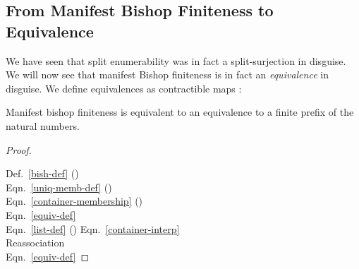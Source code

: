 \subsection{From Manifest Bishop Finiteness to Equivalence}
We have seen that split enumerability was in fact a split-surjection in
disguise.
We will now see that manifest Bishop finiteness is in fact an \emph{equivalence}
in disguise.
We define equivalences as contractible maps \cite[definition 4.4.1]{hottbook}:
  \begin{agdalisting} \label{equiv-def}
    \begin{multicols}{2}
       \columnbreak
    \end{multicols}
  \end{agdalisting}
\begin{lemma} \label{bishop-equiv}
  Manifest bishop finiteness is equivalent to an equivalence to a finite prefix
  of the natural numbers.
  \begin{agdalisting*}
  \end{agdalisting*}
\end{lemma}
\begin{proof} \let\qed\relax \vspace{-1\baselineskip}\phantom{Proof.} \\
  \begin{minipage}[t]{.83\textwidth}\vspace{-1.25\baselineskip}
    \begin{agdalisting*}
    \end{agdalisting*}
  \end{minipage}
  \begin{minipage}[t]{.16\textwidth}

    Def.~\ref{bish-def} ()     \\
    Eqn.~\ref{uniq-memb-def} (\AgdaDatatype{\ensuremath{\in!}})       \\
    Eqn.~\ref{container-membership} (\AgdaDatatype{\ensuremath{\in}}) \\
    Eqn.~\ref{equiv-def} \\
    Eqn.~\ref{list-def} ({})
    Eqn.~\ref{container-interp}  \\
    Reassociation \\
    Eqn.~\ref{equiv-def}
  \end{minipage}
\end{proof}

